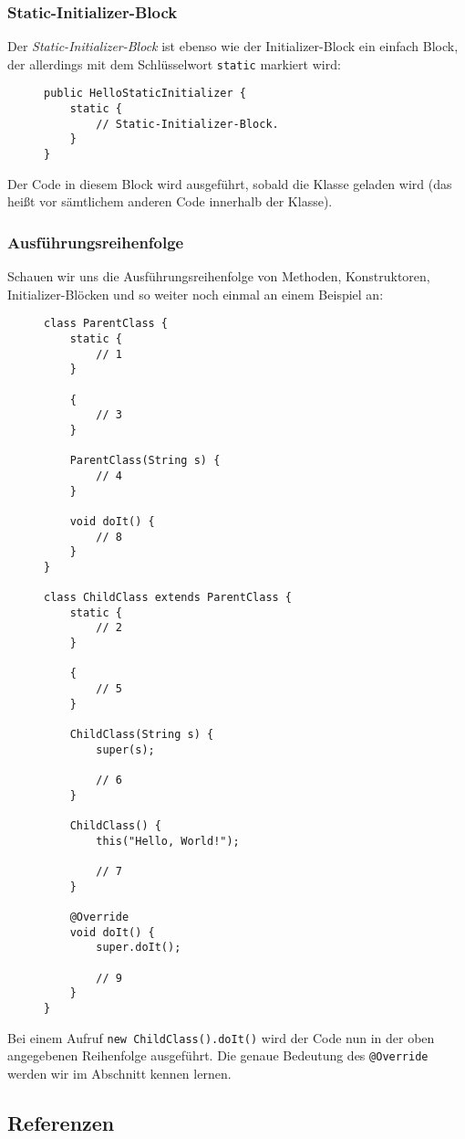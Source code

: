 	\subsubsection{Static-Initializer-Block}
		Der \textit{Static-Initializer-Block} ist ebenso wie der Initializer-Block ein einfach Block, der allerdings mit dem Schlüsselwort \lstinline|static| markiert wird:
		\begin{figure}[H]
			\centering
			\begin{lstlisting}
public HelloStaticInitializer {
	static {
		// Static-Initializer-Block.
	}
}
\end{lstlisting}
\end{figure}
		Der Code in diesem Block wird ausgeführt, sobald die Klasse geladen wird (das heißt vor sämtlichem anderen Code innerhalb der Klasse).
	
	\subsubsection{Ausführungsreihenfolge}
		Schauen wir uns die Ausführungsreihenfolge von Methoden, Konstruktoren, Initializer-Blöcken und so weiter noch einmal an einem Beispiel an:
		\begin{figure}[H]
			\centering
			\begin{lstlisting}
class ParentClass {
	static {
		// 1
	}
	
	{
		// 3
	}
	
	ParentClass(String s) {
		// 4
	}
	
	void doIt() {
		// 8
	}
}

class ChildClass extends ParentClass {
	static {
		// 2
	}
	
	{
		// 5
	}
	
	ChildClass(String s) {
		super(s);
		
		// 6
	}
	
	ChildClass() {
		this("Hello, World!");
		
		// 7
	}
	
	@Override
	void doIt() {
		super.doIt();
		
		// 9
	}
}
\end{lstlisting}
		\end{figure}
		Bei einem Aufruf \lstinline|new ChildClass().doIt()| wird der Code nun in der oben angegebenen Reihenfolge ausgeführt. Die genaue Bedeutung des \lstinline|@Override| werden wir im Abschnitt  kennen lernen.

\subsection{Referenzen}
	
